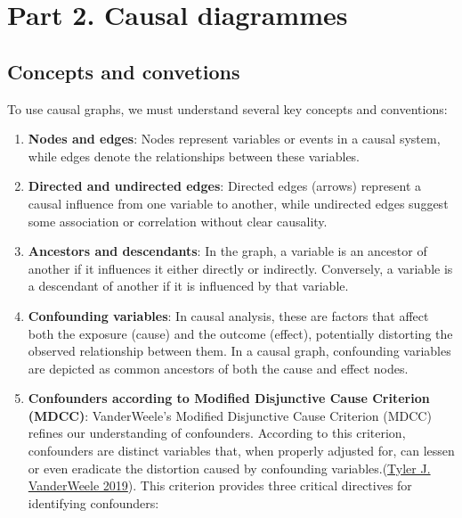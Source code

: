 \documentclass[
  singlecolumn]{report}
\begin{document}
\hypertarget{part-2.-causal-diagrammes}{%
\section{Part 2. Causal diagrammes}\label{part-2.-causal-diagrammes}}

\hypertarget{concepts-and-convetions}{%
\subsection{Concepts and convetions}\label{concepts-and-convetions}}

To use causal graphs, we must understand several key concepts and
conventions:

\begin{enumerate}
\def\labelenumi{\arabic{enumi}.}
\item
  \textbf{Nodes and edges}: Nodes represent variables or events in a
  causal system, while edges denote the relationships between these
  variables.
\item
  \textbf{Directed and undirected edges}: Directed edges (arrows)
  represent a causal influence from one variable to another, while
  undirected edges suggest some association or correlation without clear
  causality.
\item
  \textbf{Ancestors and descendants}: In the graph, a variable is an
  ancestor of another if it influences it either directly or indirectly.
  Conversely, a variable is a descendant of another if it is influenced
  by that variable.
\item
  \textbf{Confounding variables}: In causal analysis, these are factors
  that affect both the exposure (cause) and the outcome (effect),
  potentially distorting the observed relationship between them. In a
  causal graph, confounding variables are depicted as common ancestors
  of both the cause and effect nodes.
\item
  \textbf{Confounders according to Modified Disjunctive Cause Criterion
  (MDCC)}: VanderWeele's Modified Disjunctive Cause Criterion (MDCC)
  refines our understanding of confounders. According to this criterion,
  confounders are distinct variables that, when properly adjusted for,
  can lessen or even eradicate the distortion caused by confounding
  variables.(\protect\hyperlink{ref-vanderweele2019a}{Tyler J.
  VanderWeele 2019}). This criterion provides three critical directives
  for identifying confounders:


\end{enumerate}
\end{document}
